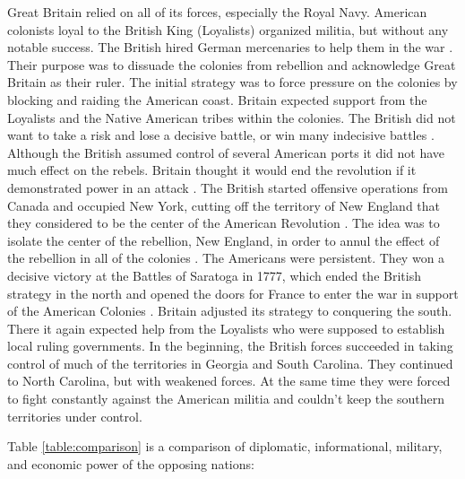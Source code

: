 Great Britain relied on all of its forces, especially the Royal Navy.  American
colonists loyal to the British King (Loyalists) organized militia, but without
any notable success.  The British hired German mercenaries to help them in the
war \cite[p.133]{higginbotham_daniel_1961}.  Their purpose was to dissuade the
colonies from rebellion and acknowledge Great Britain as their ruler.  The
initial strategy was to force pressure on the colonies by blocking and raiding
the American coast. Britain expected support from the Loyalists and the Native
American tribes within the colonies. The British did not want to take a risk and
lose a decisive battle, or win many indecisive battles
\cite[p.548]{mackesy1962british}.  Although the British assumed control of
several American ports it did not have much effect on the rebels.  Britain
thought it would end the revolution if it demonstrated power in an attack
\cite[p.49]{stewart_2005}.  The British started offensive operations from Canada
and occupied New York, cutting off the territory of New England that they
considered to be the center of the American Revolution
\cite[p.64-70]{stewart_2005}.  The idea was to isolate the center of the
rebellion, New England, in order to annul the effect of the rebellion in all of
the colonies \cite[p.548]{mackesy1962british}.  The Americans were persistent.
They won a decisive victory at the Battles of Saratoga in 1777, which ended the
British strategy in the north and opened the doors for France to enter the war
in support of the American Colonies \cite[85]{stewart_2005}.  Britain adjusted
its strategy to conquering the south.  There it again expected help from the
Loyalists who were supposed to establish local ruling governments.  In the
beginning, the British forces succeeded in taking control of much of the
territories in Georgia and South Carolina.  They continued to North Carolina,
but with weakened forces.  At the same time they were forced to fight constantly
against the American militia and couldn’t keep the southern territories under
control. \cite[551]{mackesy1962british}

Table \ref{table:comparison} is a comparison of diplomatic, informational, military,
and economic power of the opposing nations:





